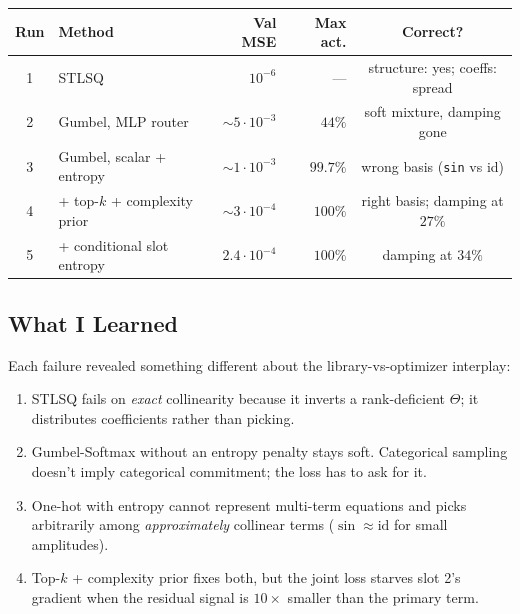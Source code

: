 \begin{center}
    \begin{tabular}{clrrc}
        \toprule
        Run & Method                        & Val MSE           & Max act. & Correct? \\
        \midrule
        1   & STLSQ                         & $10^{-6}$         & ---      & structure: yes; coeffs: spread \\
        2   & Gumbel, MLP router            & $\sim 5\cdot 10^{-3}$ & $44\%$   & soft mixture, damping gone \\
        3   & Gumbel, scalar + entropy      & $\sim 1\cdot 10^{-3}$ & $99.7\%$ & wrong basis (\texttt{sin} vs id) \\
        4   & + top-$k$ + complexity prior  & $\sim 3\cdot 10^{-4}$ & $100\%$  & right basis; damping at $27\%$ \\
        5   & + conditional slot entropy    & $2.4\cdot 10^{-4}$ & $100\%$  & damping at $34\%$ \\
        \bottomrule
    \end{tabular}
\end{center}

\subsection*{What I Learned}

Each failure revealed something different about the library-vs-optimizer
interplay:

\begin{enumerate}
    \item STLSQ fails on \emph{exact} collinearity because it inverts a
          rank-deficient $\Theta$; it distributes coefficients rather
          than picking.
    \item Gumbel-Softmax without an entropy penalty stays soft.
          Categorical sampling doesn't imply categorical commitment;
          the loss has to ask for it.
    \item One-hot with entropy cannot represent multi-term equations
          and picks arbitrarily among \emph{approximately} collinear
          terms ($\sin \approx \mathrm{id}$ for small amplitudes).
    \item Top-$k$ + complexity prior fixes both, but the joint loss
          starves slot 2's gradient when the residual signal is $10\times$
          smaller than the primary term.
\end{enumerate}

